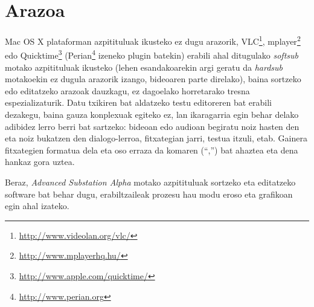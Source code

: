 \section{Arazoa}
Mac OS X plataforman azpitituluak ikusteko ez dugu arazorik, VLC\footnote{\url{http://www.videolan.org/vlc/}}, mplayer\footnote{\url{http://www.mplayerhq.hu/}} edo Quicktime\footnote{\url{http://www.apple.com/quicktime/}} (Perian\footnote{\url{http://www.perian.org}} izeneko plugin batekin) erabili ahal ditugulako \textit{softsub} motako azpitituluak ikusteko (lehen esandakoarekin argi geratu da \textit{hardsub} motakoekin ez dugula arazorik izango, bideoaren parte direlako), baina sortzeko edo editatzeko arazoak dauzkagu, ez dagoelako horretarako tresna espezializaturik. Datu txikiren bat aldatzeko testu editoreren bat erabili dezakegu, baina gauza konplexuak egiteko ez, lan ikaragarria egin behar delako adibidez lerro berri bat sartzeko: bideoan edo audioan begiratu noiz hasten den eta noiz bukatzen den dialogo-lerroa, fitxategian jarri, testua itzuli, etab. Gainera fitxategien formatua dela eta oso erraza da komaren (``,'') bat ahaztea eta dena hankaz gora uztea.

Beraz, \textit{Advanced Substation Alpha} motako azpitituluak sortzeko eta editatzeko software bat behar dugu, erabiltzaileak prozesu hau modu eroso eta grafikoan egin ahal izateko.